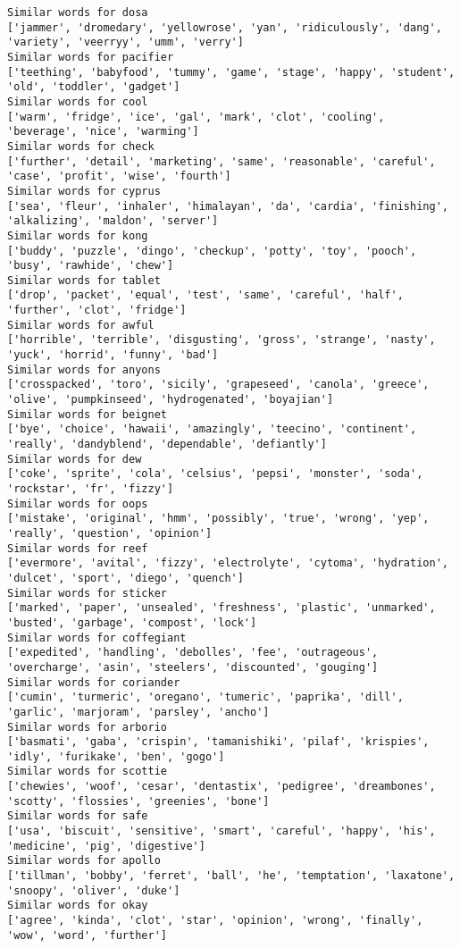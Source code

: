 \documentclass[11pt]{article}
\begin{document}
\begin{Verbatim}[commandchars=\\\{\}]
Similar words for dosa
['jammer', 'dromedary', 'yellowrose', 'yan', 'ridiculously', 'dang', 'variety', 'veerryy', 'umm', 'verry']
Similar words for pacifier
['teething', 'babyfood', 'tummy', 'game', 'stage', 'happy', 'student', 'old', 'toddler', 'gadget']
Similar words for cool
['warm', 'fridge', 'ice', 'gal', 'mark', 'clot', 'cooling', 'beverage', 'nice', 'warming']
Similar words for check
['further', 'detail', 'marketing', 'same', 'reasonable', 'careful', 'case', 'profit', 'wise', 'fourth']
Similar words for cyprus
['sea', 'fleur', 'inhaler', 'himalayan', 'da', 'cardia', 'finishing', 'alkalizing', 'maldon', 'server']
Similar words for kong
['buddy', 'puzzle', 'dingo', 'checkup', 'potty', 'toy', 'pooch', 'busy', 'rawhide', 'chew']
Similar words for tablet
['drop', 'packet', 'equal', 'test', 'same', 'careful', 'half', 'further', 'clot', 'fridge']
Similar words for awful
['horrible', 'terrible', 'disgusting', 'gross', 'strange', 'nasty', 'yuck', 'horrid', 'funny', 'bad']
Similar words for anyons
['crosspacked', 'toro', 'sicily', 'grapeseed', 'canola', 'greece', 'olive', 'pumpkinseed', 'hydrogenated', 'boyajian']
Similar words for beignet
['bye', 'choice', 'hawaii', 'amazingly', 'teecino', 'continent', 'really', 'dandyblend', 'dependable', 'defiantly']
Similar words for dew
['coke', 'sprite', 'cola', 'celsius', 'pepsi', 'monster', 'soda', 'rockstar', 'fr', 'fizzy']
Similar words for oops
['mistake', 'original', 'hmm', 'possibly', 'true', 'wrong', 'yep', 'really', 'question', 'opinion']
Similar words for reef
['evermore', 'avital', 'fizzy', 'electrolyte', 'cytoma', 'hydration', 'dulcet', 'sport', 'diego', 'quench']
Similar words for sticker
['marked', 'paper', 'unsealed', 'freshness', 'plastic', 'unmarked', 'busted', 'garbage', 'compost', 'lock']
Similar words for coffegiant
['expedited', 'handling', 'debolles', 'fee', 'outrageous', 'overcharge', 'asin', 'steelers', 'discounted', 'gouging']
Similar words for coriander
['cumin', 'turmeric', 'oregano', 'tumeric', 'paprika', 'dill', 'garlic', 'marjoram', 'parsley', 'ancho']
Similar words for arborio
['basmati', 'gaba', 'crispin', 'tamanishiki', 'pilaf', 'krispies', 'idly', 'furikake', 'ben', 'gogo']
Similar words for scottie
['chewies', 'woof', 'cesar', 'dentastix', 'pedigree', 'dreambones', 'scotty', 'flossies', 'greenies', 'bone']
Similar words for safe
['usa', 'biscuit', 'sensitive', 'smart', 'careful', 'happy', 'his', 'medicine', 'pig', 'digestive']
Similar words for apollo
['tillman', 'bobby', 'ferret', 'ball', 'he', 'temptation', 'laxatone', 'snoopy', 'oliver', 'duke']
Similar words for okay
['agree', 'kinda', 'clot', 'star', 'opinion', 'wrong', 'finally', 'wow', 'word', 'further']

\end{Verbatim}
\end{document}
